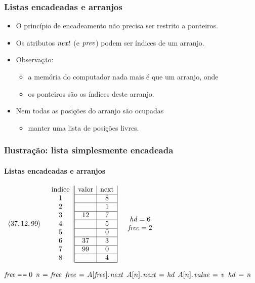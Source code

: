 \documentclass{beamer}
\begin{document}
\begin{frame}

  \frametitle{Listas encadeadas e arranjos}

  \begin{itemize}
    \item O princípio de encadeamento não precisa ser restrito a ponteiros.
    \item Os atributos $\id{next}$ (e $\id{prev}$) podem ser índices de um arranjo.
    \item Observação:
      \begin{itemize}
        \item a memória do computador nada mais é que um arranjo, onde
        \item os ponteiros são os índices deste arranjo.
      \end{itemize}
    \item Nem todas as posições do arranjo são ocupadas
      \begin{itemize}
        \item manter uma lista de posições livres.
      \end{itemize}
  \end{itemize}
\end{frame}

\begin{frame}

  \frametitle{Ilustração: lista simplesmente encadeada}
  \framesubtitle{Listas encadeadas e arranjos}

  $\begin{array}{ccc}
    \langle 37, 12, 99 \rangle &
    \begin{array}{c||c|c|c||}
      \mbox{índice} & \mbox{valor} & \mbox{next} \\
      \cline{2-3}
      1 & & 8 \\
      \cline{2-3}
      2 & & 1 \\
      \cline{2-3}
      3 & 12 & 7\\
      \cline{2-3}
      4 & & 5 \\
      \cline{2-3}
      5 & & 0 \\
      \cline{2-3}
      6 & 37 & 3 \\
      \cline{2-3}
      7 & 99 & 0 \\
      \cline{2-3}
      8 & & 4 \\
      \cline{2-3}
  \end{array}
    &
    \begin{array}{c}
      \id{hd} = 6 \\
      \id{free} = 2
    \end{array}
  \end{array}$

  \begin{codebox}
    \zi \If $\id{free} \isequal 0$
    \zi \Then \Return
      \End
    \zi $\id{n} \gets \id{free}$
    \zi $\id{free} \gets \attrib{A[\id{free}]}{next}$
    \zi $\attrib{A[n]}{next} \gets \id{hd}$
    \zi $\attrib{A[n]}{value} \gets \id{v}$
    \zi $\id{hd} \gets \id{n}$
  \end{codebox}

\end{frame}
\end{document}
